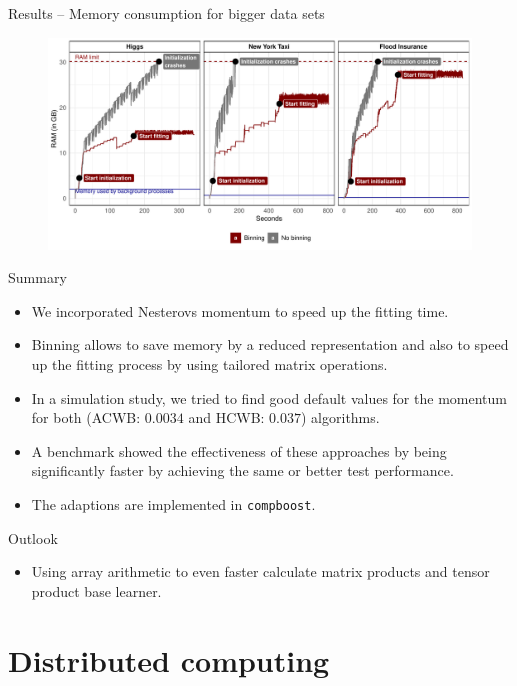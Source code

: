 \documentclass[t,10pt]{beamer}
\begin{document}
\begin{frame}{Results -- Memory consumption for bigger data sets}
  \begin{figure}
    \centering
    \includegraphics[width=\textwidth]{figures/fig-cacb-big-data.pdf}
  \end{figure}
\end{frame}

\begin{frame}{Summary}
  \begin{itemize}
    \item
      We incorporated Nesterovs momentum to speed up the fitting time.
    \item
      Binning allows to save memory by a reduced representation and also to speed up the fitting process by using tailored matrix operations.
    \item
      In a simulation study, we tried to find good default values for the momentum for both (ACWB: $0.0034$ and HCWB: $0.037$) algorithms.
    \item
      A benchmark showed the effectiveness of these approaches by being significantly faster by achieving the same or better test performance.
    \item
      The adaptions are implemented in \texttt{compboost}.
  \end{itemize}
\end{frame}

\begin{frame}{Outlook}
  \begin{itemize}
    \item
      Using array arithmetic to even faster calculate matrix products and tensor product base learner.
  \end{itemize}
\end{frame}

\section{Distributed computing}
\end{document}
